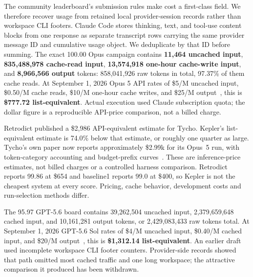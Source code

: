 \documentclass[11pt]{article}
\begin{document}
The community leaderboard's submission rules make cost a first-class field. We therefore recover usage from retained local provider-session records rather than workspace CLI footers. Claude Code stores thinking, text, and tool-use content blocks from one response as separate transcript rows carrying the same provider message ID and cumulative usage object. We deduplicate by that ID before summing. The exact 100.00 Opus campaign contains \textbf{11,464 uncached input}, \textbf{835,488,978 cache-read input}, \textbf{13,574,918 one-hour cache-write input}, and \textbf{8,966,566 output} tokens: 858,041,926 raw tokens in total, 97.37\% of them cache reads. At September 1, 2026 Opus 5 API rates of \$5/M uncached input, \$0.50/M cache reads, \$10/M one-hour cache writes, and \$25/M output~\citep{anthropicopus5pricing}, this is \textbf{\$777.72 list-equivalent}. Actual execution used Claude subscription quota; the dollar figure is a reproducible API-price comparison, not a billed charge.

Retrodict published a \$2,986 API-equivalent estimate for Tycho. Kepler's list-equivalent estimate is 74.0\% below that estimate, or roughly one quarter as large. Tycho's own paper now reports approximately \$2.99k for its Opus~5 run, with token-category accounting and budget-prefix curves~\citep{tycho}. These are inference-price estimates, not billed charges or a controlled harness comparison. Retrodict reports 99.86 at \$654 and baseline1 reports 99.0 at \$400, so Kepler is not the cheapest system at every score. Pricing, cache behavior, development costs and run-selection methods differ.

The 95.97 GPT-5.6 board contains 39,262,504 uncached input, 2,379,659,648 cached input, and 10,161,281 output tokens, or 2,429,083,433 raw tokens total. At September 1, 2026 GPT-5.6 Sol rates of \$4/M uncached input, \$0.40/M cached input, and \$20/M output~\citep{openaigpt56pricing}, this is \textbf{\$1,312.14 list-equivalent}. An earlier draft used incomplete workspace CLI footer counters. Provider-side records showed that path omitted most cached traffic and one long workspace; the attractive comparison it produced has been withdrawn.
\end{document}
